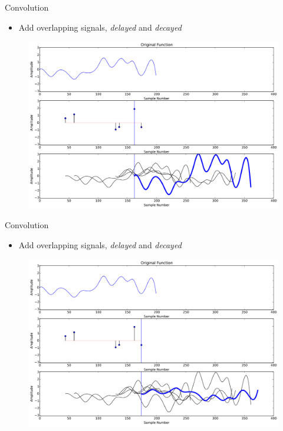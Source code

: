 \documentclass{beamer}
\begin{document}
\begin{frame}{Convolution}

\begin{itemize}[label=$\vartriangleright$]
\item Add overlapping signals, {\em delayed} and {\em decayed}
\end{itemize}

\begin{figure}[t]
	\centering
    \includegraphics[width=\textwidth]{Conv4.pdf}
\end{figure}


\end{frame}

\begin{frame}{Convolution}

\begin{itemize}[label=$\vartriangleright$]
\item Add overlapping signals, {\em delayed} and {\em decayed}
\end{itemize}

\begin{figure}[t]
	\centering
    \includegraphics[width=\textwidth]{Conv5.pdf}
\end{figure}


\end{frame}
\end{document}
